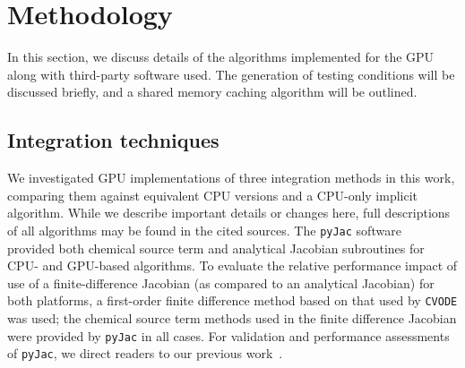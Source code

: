 \documentclass[final,twocolumn]{elsarticle}
\begin{document}
\section{Methodology}
\label{S:method}
\ifmeasure
\addvspace{10pt}
\fi

In this section, we discuss details of the algorithms implemented for the GPU along with third-party software used.
The generation of testing conditions will be discussed briefly, and a shared memory caching algorithm will be outlined.

\subsection{Integration techniques}

We investigated GPU implementations of three integration methods in this work, comparing them against equivalent CPU versions and a CPU-only implicit algorithm.
While we describe important details or changes here, full descriptions of all algorithms may be found in the cited sources.
The \texttt{pyJac} software~\cite{Niemeyer:2015im,Niemeyer:2015ws} provided both chemical source term and analytical Jacobian subroutines for CPU- and GPU-based algorithms.
To evaluate the relative performance impact of use of a finite-difference Jacobian (as compared to an analytical Jacobian) for both platforms, a first-order finite difference method based on that used by \texttt{CVODE} was used; the chemical source term methods used in the finite difference Jacobian were provided by \texttt{pyJac} in all cases.
For validation and performance assessments of \texttt{pyJac}, we direct readers to our previous work~\cite{Niemeyer:2015ws}.
\end{document}
